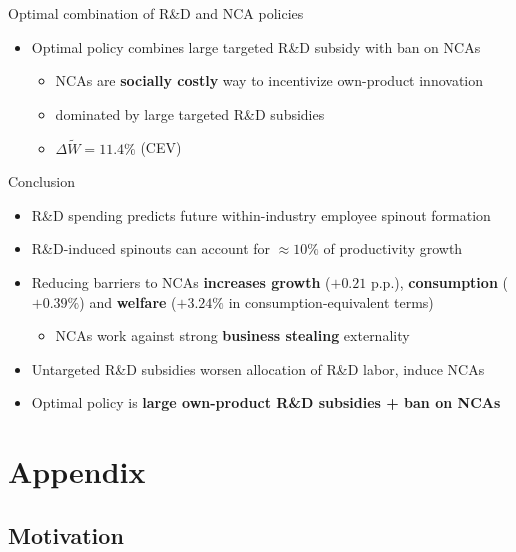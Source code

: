 \documentclass[english,usenames,dvipsnames]{beamer}
\begin{document}
\begin{frame}{Optimal combination of R\&D and NCA policies}\label{all_policies_overview}
	\begin{itemize}
		\item  Optimal policy combines large targeted R\&D subsidy with ban on NCAs \hyperlink{plots:all_policies}{} 
		\begin{itemize}
			\item NCAs are \alert{\textbf{socially costly}} way to incentivize own-product innovation
			\item dominated by large targeted R\&D subsidies
			\item $\Delta \tilde{W} = 11.4\%$ (CEV)
		\end{itemize}
	\end{itemize}
\end{frame}

\begin{frame}{Conclusion}
	\small
	\begin{itemize}
		\item R\&D spending predicts future within-industry employee spinout formation
		\smallskip
		\item R\&D-induced spinouts can account for $\approx 10\%$ of productivity growth
		\smallskip
		\item Reducing barriers to NCAs \alert{\textbf{increases growth}} ($+0.21$ p.p.), \alert{\textbf{consumption}} ($+0.39\%$) and \alert{\textbf{welfare}} ($+3.24\%$ in consumption-equivalent terms)
		\begin{itemize}
			\item NCAs work against strong \alert{\textbf{business stealing}} externality
		\end{itemize}
		\smallskip
		\item Untargeted R\&D subsidies worsen allocation of R\&D labor, induce NCAs
		\smallskip
		\item Optimal policy is \alert{\textbf{large own-product R\&D subsidies + ban on NCAs}}
	\end{itemize}
\end{frame}

\appendix

\section{Appendix}

\subsection{Motivation}
\end{document}
